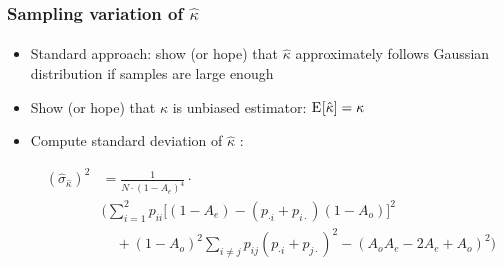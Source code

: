 \documentclass[t]{beamer} %
\begin{document}
\begin{frame}
  \frametitle{Sampling variation of $\hat{\kappa}$}
  \framesubtitle{\citep{Fleiss:Cohen:Everitt:69,Krenn:Evert:Zinsmeister:04}}

  \begin{itemize}
  \item<1-> Standard approach: show (or hope) that $\hat{\kappa}$ approximately
    follows Gaussian distribution if samples are large enough
  \item<2-> Show (or hope) that $\hat{\kappa}$ is unbiased estimator: $\mathrm{E}_{}[\hat{\kappa}] = \kappa$
  \item<3-> Compute standard deviation of $\hat{\kappa}$
    \citep[325]{Fleiss:Cohen:Everitt:69}:
    \begin{footnotesize}
    \begin{equation*}
      \begin{split}
        (\hat{\sigma}_{\hat{\kappa}})^2 &= 
        \frac{1}{N\cdot (1 - A_e)^4} \cdot \\
        & \Biggl(
        \sum_{i=1}^2 p_{ii} \bigl[
        (1 - A_e) - (p_{\cdot i} + p_{i\cdot})(1 - A_o)
        \bigr]^2 \\
        & \quad + (1 - A_o)^2 \sum_{i\neq j}
        p_{ij} (p_{\cdot i} + p_{j\cdot})^2 
        - (A_o A_e - 2 A_e + A_o)^2 \Biggr)
      \end{split}
    \end{equation*}
    \end{footnotesize}
  \end{itemize}
\end{frame}
\end{document}
